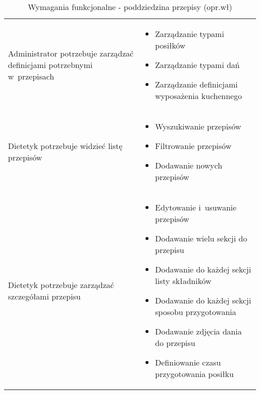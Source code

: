 \begin{minipage}{\textwidth}
    \begin{table}[H]
        \centering\caption{Wymagania funkcjonalne - poddziedzina przepisy (opr.wł)\label{tabela:wymaganiaFunkcjonalnePrzepisy}}
        \begin{tabular}{|P{.3\textwidth}|P{.6\textwidth}|}
            \hline
             &  \\

            \hline
            Administrator potrzebuje zarządzać definicjami potrzebnymi w~przepisach &
            \begin{itemize}
                \item Zarządzanie typami posiłków
                \item Zarządzanie typami dań
                \item Zarządzanie definicjami wyposażenia kuchennego
            \end{itemize} \\
            \hline
            Dietetyk potrzebuje widzieć listę przepisów &
            \begin{itemize}
                \item Wyszukiwanie przepisów
                \item Filtrowanie przepisów
                \item Dodawanie nowych przepisów
            \end{itemize} \\
            \hline
            Dietetyk potrzebuje zarządzać szczegółami przepisu &
            \begin{itemize}
                \item Edytowanie i~usuwanie przepisów
                \item Dodawanie wielu sekcji do przepisu
                \item Dodawanie do każdej sekcji listy składników
                \item Dodawanie do każdej sekcji sposobu przygotowania
                \item Dodawanie zdjęcia dania do przepisu
                \item Definiowanie czasu przygotowania posiłku
            \end{itemize} \\
            \hline
        \end{tabular}
    \end{table}
\end{minipage}

